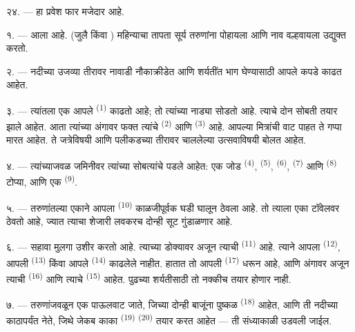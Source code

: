 २४. --- हा प्रवेश फार मजेदार आहे.

\VUsaut{4.0mm}
\VUsaut{3.0mm}

\VUsaut{2.4mm}

\VUsaut{3.0mm}

१. ---  आला आहे.  (जुलै किंवा )
महिन्याचा तापता सूर्य तरुणांना पोहायला आणि नाव वल्हवायला उद्युक्त करतो.

२. --- नदीच्या उजव्या तीरावर नावाडी नौकाक्रीडेत आणि शर्यतींत भाग घेण्यासाठी
आपले कपडे काढत आहेत.

३. --- त्यांतला एक आपले  \textsuperscript{(1)} काढतो आहे; तो त्यांच्या
नाड्या सोडतो आहे. त्याचे दोन सोबती तयार झाले आहेत. आता त्यांच्या अंगावर फक्त
त्यांचे  \textsuperscript{(2)} आणि 
\textsuperscript{(3)} आहे. आपल्या मित्रांची वाट पाहत ते गप्पा मारत आहेत. ते
जत्रेविषयी आणि पलीकडच्या तीरावर चाललेल्या उत्सवाविषयी बोलत आहेत.

४. --- त्यांच्याजवळ जमिनीवर त्यांच्या सोबत्यांचे  पडले आहेत: एक जोड
 \textsuperscript{(4)},  \textsuperscript{(5)},
 \textsuperscript{(6)},  \textsuperscript{(7)} आणि
 \textsuperscript{(8)} टोप्या, आणि एक 
\textsuperscript{(9)}.

५. --- तरुणांतल्या एकाने आपला  \textsuperscript{(10)} काळजीपूर्वक घडी
घालून ठेवला आहे. तो त्याला एका टॉवेलवर ठेवतो आहे, ज्यात त्याचा शेजारी लवकरच दोन्ही
सूट गुंडाळणार आहे.

६. --- सहावा मुलगा उशीर करतो आहे. त्याच्या डोक्यावर अजून त्याची 
\textsuperscript{(11)} आहे. त्याने आपला  \textsuperscript{(12)}, आपली
 \textsuperscript{(13)} किंवा आपले  \textsuperscript{(14)}
काढलेले नाहीत. हातात तो आपली  \textsuperscript{(17)} धरून आहे, आणि
अंगावर अजून त्याची  \textsuperscript{(16)} आणि त्याचे 
\textsuperscript{(15)} आहेत. पुढच्या शर्यतीसाठी तो नक्कीच तयार होणार नाही.

७. --- तरुणांजवळून एक पाऊलवाट जाते, जिच्या दोन्ही बाजूंना पुष्कळ  \textsuperscript{(18)} आहेत, आणि ती नदीच्या काठापर्यंत नेते, जिथे जेकब
काका  \textsuperscript{(19)} 
\textsuperscript{(20)} तयार करत आहेत --- ती संध्याकाळी उडवली जाईल.

